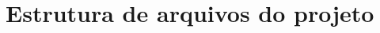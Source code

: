 \section{Estrutura de arquivos do projeto}
\label{apendice:estrutura-backend}

\begin{figure}[H]
\small
{}
\end{figure}
\normalsize
\endinput
